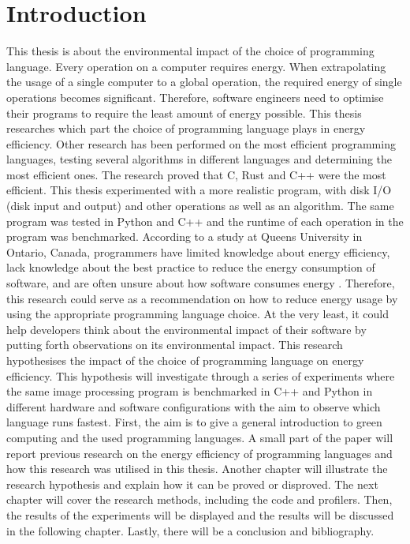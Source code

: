 \chapter{Introduction}
\setcounter{page}{1}

This thesis is about the environmental impact of the choice of programming language. Every operation on a computer requires energy. When extrapolating the usage of a single computer to a global operation, the required energy of single operations becomes significant. Therefore, software engineers need to optimise their programs to require the least amount of energy possible. This thesis researches which part the choice of programming language plays in energy efficiency.
Other research has been performed on the most efficient programming languages, testing several algorithms in different languages and determining the most efficient ones. The research proved that C, Rust and C++ were the most efficient. This thesis experimented with a more realistic program, with disk I/O (disk input and output) and other operations as well as an algorithm. The same program was tested in Python and C++ and the runtime of each operation in the program was benchmarked.
According to a study at Queens University in Ontario, Canada, programmers have limited knowledge about energy efficiency, lack knowledge about the best practice to reduce the energy consumption of software, and are often unsure about how software consumes energy \cite{programmers}.
Therefore, this research could serve as a recommendation on how to reduce energy usage by using the appropriate programming language choice. At the very least, it could help developers think about the environmental impact of their software by putting forth observations on its environmental impact.
This research hypothesises the impact of the choice of programming language on energy efficiency. This hypothesis will investigate through a series of experiments where the same image processing program is benchmarked in C++ and Python in different hardware and software configurations with the aim to observe which language runs fastest.
First, the aim is to give a general introduction to green computing and the used programming languages. A small part of the paper will report previous research on the energy efficiency of programming languages and how this research was utilised in this thesis. Another chapter will illustrate the research hypothesis and explain how it can be proved or disproved. The next chapter will cover the research methods, including the code and profilers. Then, the results of the experiments will be displayed and the results will be discussed in the following chapter. Lastly, there will be a conclusion and bibliography.
